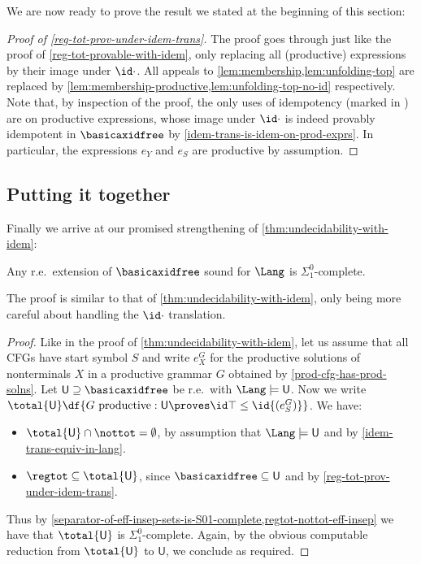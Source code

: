 We are now ready to prove the result we stated at the beginning of this section:

\begin{proof}
    [Proof of \cref{reg-tot-prov-under-idem-trans}]
    The proof goes through just like the proof of \cref{reg-tot-provable-with-idem}, only replacing all (productive) expressions by their image under $\id \cdot$.
    All appeals to \cref{lem:membership,lem:unfolding-top} are replaced by \cref{lem:membership-productive,lem:unfolding-top-no-id} respectively.
    Note that, by inspection of the proof, the only uses of idempotency (marked in ) are on productive expressions, whose image under $\id \cdot$ is indeed provably idempotent in $\basicaxidfree$ by \cref{idem-trans-is-idem-on-prod-exprs}.
    In particular, the expressions $e_Y$ and $e_S$ are productive by assumption.
\end{proof}

\subsection{Putting it together}
Finally we arrive at our promised strengthening of \cref{thm:undecidability-with-idem}:
\begin{theorem}
\label{thm:undecidability-without-idem}
    Any r.e.\ extension of $\basicaxidfree$ sound for $\Lang$ is $\Sigma^0_1$-complete.
\end{theorem}
The proof is similar to that of \cref{thm:undecidability-with-idem}, only being more careful about handling the $\id\cdot$ translation.
\begin{proof}
    Like in the proof of \cref{thm:undecidability-with-idem}, let us assume that all CFGs have start symbol $S$ and write $e^G_X$ for the productive solutions of nonterminals $X$ in a productive grammar $G$ obtained by \cref{prod-cfg-has-prod-solns}.
    Let $\mathsf U \supseteq \basicaxidfree$ be r.e.\ with $\Lang \models \mathsf U$.
    Now we write $\total{\mathsf U} \df \{G \text{ productive}: \mathsf U \proves \id \top \leq \id{(e^G_S)}\}$. We have:
    \begin{itemize}
        \item $\total {\mathsf U} \cap \nottot = \emptyset$, by assumption that $\Lang \models \mathsf U $ and by \cref{idem-trans-equiv-in-lang}.
        \item $\regtot \subseteq \total{\mathsf U}$, since $\basicaxidfree\subseteq \mathsf U$ and by \cref{reg-tot-prov-under-idem-trans}.
    \end{itemize}
    Thus by \cref{separator-of-eff-insep-sets-is-S01-complete,regtot-nottot-eff-insep} we have that $\total{\mathsf U}$ is $\Sigma^0_1$-complete.
    Again, by the obvious computable reduction from $\total{\mathsf U}$ to $\mathsf U$, we conclude as required. 
\end{proof}



